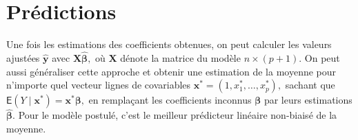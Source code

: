 \documentclass[
  11pt,
  letterpaper,
]{scrbook}
\theoremstyle{plain}
\theoremstyle{plain}
\theoremstyle{definition}
\theoremstyle{definition}
\theoremstyle{remark}
\begin{document}
\section{Prédictions}\label{sec-predictions-lm}

Une fois les estimations des coefficients obtenues, on peut calculer les
valeurs ajustées \(\widehat{\boldsymbol{y}}\) avec
\(\mathbf{X}\widehat{\boldsymbol{\beta}},\) où \(\mathbf{X}\) dénote la
matrice du modèle \(n \times (p+1).\) On peut aussi généraliser cette
approche et obtenir une estimation de la moyenne pour n'importe quel
vecteur lignes de covariables
\(\mathbf{x}^* = (1, x^*_1, \ldots, x^*_p),\) sachant que
\(\mathsf{E}(Y \mid \mathbf{x}^*)=\mathbf{x}^*\boldsymbol{\beta},\) en
remplaçant les coefficients inconnus \(\boldsymbol{\beta}\) par leurs
estimations \(\widehat{\boldsymbol{\beta}}.\) Pour le modèle postulé,
c'est le meilleur prédicteur linéaire non-biaisé de la moyenne.
\end{document}
